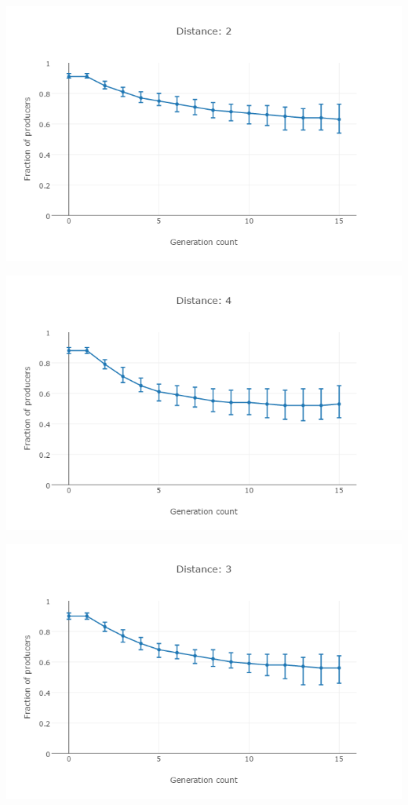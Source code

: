 \begin{minipage}{\linewidth}
	\centering
	\begin{multicols}{2}
		\begin{Figure}
			\centering
			\includegraphics[width=\linewidth]{images/dist2}
		\end{Figure}
		\begin{Figure}
			\centering
			\includegraphics[width=\linewidth]{images/dist4}
		\end{Figure}
		\begin{Figure}
			\centering
			\includegraphics[width=\linewidth]{images/dist3}

\end{Figure}
\end{multicols}
\end{minipage}
